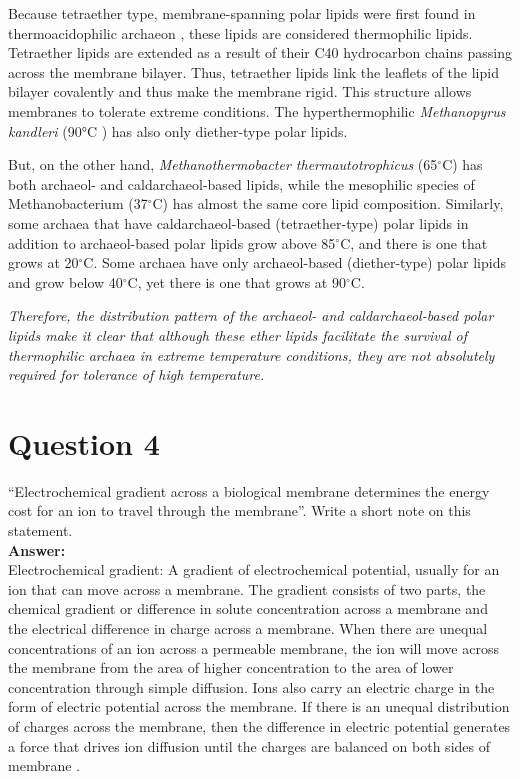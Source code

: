 \documentclass[11pt]{scrartcl}
\begin{document}
		Because tetraether type, membrane-spanning polar lipids were first found in thermoacidophilic archaeon \cite{Rosa}, these lipids are considered thermophilic lipids. Tetraether lipids are extended as a result of their C40 hydrocarbon chains passing across the membrane bilayer. Thus, tetraether lipids link the leaflets of the lipid bilayer covalently and thus make the membrane rigid. This structure allows membranes to tolerate extreme conditions.  The hyperthermophilic \emph{Methanopyrus kandleri} (90°C \cite{Nakamo}) has also only diether-type polar lipids.
		
		But, on the other hand, \emph{Methanothermobacter thermautotrophicus} (65$^\circ$C) has both archaeol- and caldarchaeol-based lipids, while the mesophilic species of Methanobacterium (37$^\circ$C) has almost the same core lipid composition. Similarly, some archaea that have caldarchaeol-based (tetraether-type) polar lipids in addition to archaeol-based polar lipids grow above 85$^\circ$C, and there is one that grows at 20$^\circ$C. Some archaea have only archaeol-based (diether-type) polar lipids and grow below 40$^\circ$C, yet there is one that grows at 90$^\circ$C.
		
		\emph{Therefore, the distribution pattern of the archaeol- and caldarchaeol-based polar lipids make it clear that although these ether lipids facilitate the survival of thermophilic archaea in extreme temperature conditions, they are not absolutely required for tolerance of high temperature.}
		
		\pagebreak
		
		\section{Question 4}
		
		“Electrochemical gradient across a biological membrane determines the energy cost for an ion to travel through the membrane”. Write a short note on this statement.\\[2pt]
		
		\textbf{Answer:}\\[2pt]
		
		Electrochemical gradient: A gradient of electrochemical potential, usually for an ion that can move across a membrane. The gradient consists of two parts, the chemical gradient or difference in solute concentration across a membrane and the electrical difference in charge across a membrane. When there are unequal concentrations of an ion across a permeable membrane, the ion will move across the membrane from the area of higher concentration to the area of lower concentration through simple diffusion. Ions also carry an electric charge in the form of electric potential across the membrane. If there is an unequal distribution of charges across the membrane, then the difference in electric potential generates a force that drives ion diffusion until the charges are balanced on both sides of membrane .
		
\end{document}
